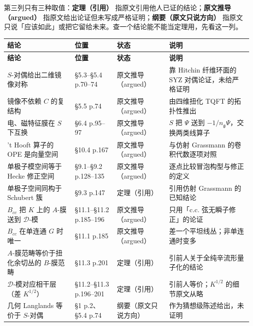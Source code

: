 第三列只有三种取值：\textbf{定理（引用）} 指原文引用他人已证的结论；\textbf{原文推导（argued）} 指原文给出论证但未写成严格证明；\textbf{纲要（原文只说方向）} 指原文只说「应该如此」或把它留给未来。查一个结论能不能当定理用，先看这一列。

\begingroup
\footnotesize
\renewcommand{\arraystretch}{1.14}
\begin{longtable}{@{}p{4.5cm}p{2.9cm}p{3.2cm}p{4.3cm}@{}}
\toprule
\bfseries 结论 & \bfseries 位置 & \bfseries 状态 & \bfseries 说明 \\
\midrule
\endfirsthead
\toprule
\bfseries 结论 & \bfseries 位置 & \bfseries 状态 & \bfseries 说明 \\
\midrule
\endhead
\bottomrule
\endlastfoot

$S$-对偶给出二维镜像对称 & \S5.3--\S5.4 p.70--74 & 原文推导（argued） & 靠 Hitchin 纤维环面的 SYZ 对偶论证，未给严格证明 \\
\addlinespace[3pt]
镜像不依赖 $C$ 的复结构 & \S5.5 p.74 & 原文推导（argued） & 由四维扭化 TQFT 的拓扑性推出 \\
\addlinespace[3pt]
电、磁特征膜在 $S$ 下互换 & \S6.4 p.95--97 & 原文推导（argued） & $S$ 把 $\Psi$ 送到 $-1/n_{\mathfrak g}\Psi$，交换两类线算子 \\
\addlinespace[3pt]
't Hooft 算子的 OPE 是向量空间 & \S10.4 p.167 & 原文推导（argued） & 与仿射 Grassmann 的卷积代数逐项对照 \\
\addlinespace[3pt]
单极子模空间等于 Hecke 修正空间 & \S9.1--\S9.2 p.128--135 & 原文推导（argued） & 逐点比较冒泡构型与修正的定义 \\
\addlinespace[3pt]
单极子空间同构于 Schubert 簇 & \S9.3 p.147 & 定理（引用） & 引用仿射 Grassmann 的已知结论 \\
\addlinespace[3pt]
$B_{cc}$ 把 $K$ 上的 $A$-膜送到 $\mathcal D$-模 & \S11.1--\S11.2 p.185--196 & 原文推导（argued） & 只用「c.c. 弦无瞬子修正」的论证 \\
\addlinespace[3pt]
$B_{cc}$ 在单连通 $G$ 时唯一 & \S11.1 p.185 & 原文推导（argued） & 差一个平坦线丛；非单连通时变多 \\
\addlinespace[3pt]
$A$-膜范畴等价于扭化余切丛的 $B$-膜范畴 & \S11.3 p.201 & 定理（引用） & 引前人关于全纯辛流形量子化的结论 \\
\addlinespace[3pt]
$\mathcal D$-模对应相干层（差 $K^{1/2}$） & \S11.2--\S11.3 p.196--201 & 定理（引用） & 引前人等价；$K^{1/2}$ 的细节原文从略 \\
\addlinespace[3pt]
几何 Langlands 等价于 $S$-对偶 & \S1 p.2、\S5.4 p.74 & 纲要（原文只说方向） & 作为猜想级陈述给出，未证明 \\

\end{longtable}
